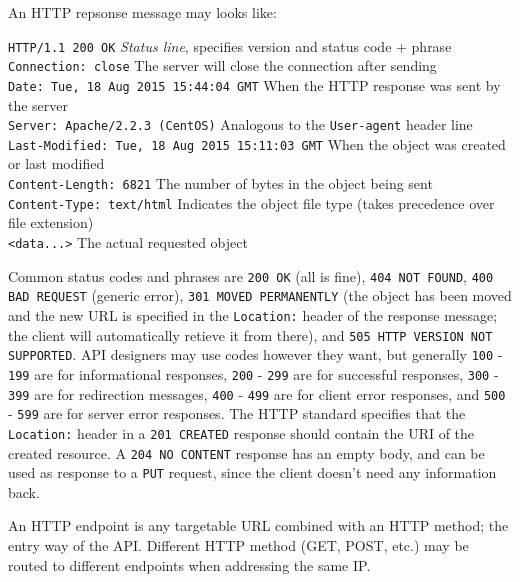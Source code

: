 \documentclass[table, xcdraw]{article}%
\begin{document}
An HTTP repsonse message may looks like:

\texttt{HTTP/1.1 200 OK} \emph{Status line}, specifies version and status code + phrase\\
\texttt{Connection: close} The server will close the connection after sending\\
\texttt{Date: Tue, 18 Aug 2015 15:44:04 GMT} When the HTTP response was sent by the server\\
\texttt{Server: Apache/2.2.3 (CentOS)} Analogous to the \texttt{User-agent} header line\\
\texttt{Last-Modified: Tue, 18 Aug 2015 15:11:03 GMT} When the object was created or last modified\\
\texttt{Content-Length: 6821} The number of bytes in the object being sent\\
\texttt{Content-Type: text/html} Indicates the object file type (takes precedence over file extension)\\
\texttt{<data...>} The actual requested object

Common status codes and phrases are \texttt{200 OK} (all is fine), \texttt{404 NOT FOUND}, \texttt{400 BAD REQUEST} (generic error), \texttt{301 MOVED PERMANENTLY} (the object has been moved and the new URL is specified in the \texttt{Location:} header of the response message; the client will automatically retieve it from there), and \texttt{505 HTTP VERSION NOT SUPPORTED}. API designers may use codes however they want, but generally \texttt{100} - \texttt{199} are for informational responses, \texttt{200} - \texttt{299} are for successful responses, \texttt{300} - \texttt{399} are for redirection messages, \texttt{400} - \texttt{499} are for client error responses, and \texttt{500} - \texttt{599} are for server error responses. The HTTP standard specifies that the \texttt{Location:} header in a \texttt{201 CREATED} response should contain the URI of the created resource. A \texttt{204 NO CONTENT} response has an empty body, and can be used as response to a \texttt{PUT} request, since the client doesn't need any information back.

An HTTP endpoint is any targetable URL combined with an HTTP method; the entry way of the API. Different HTTP method (GET, POST, etc.) may be routed to different endpoints when addressing the same IP.
\end{document}
